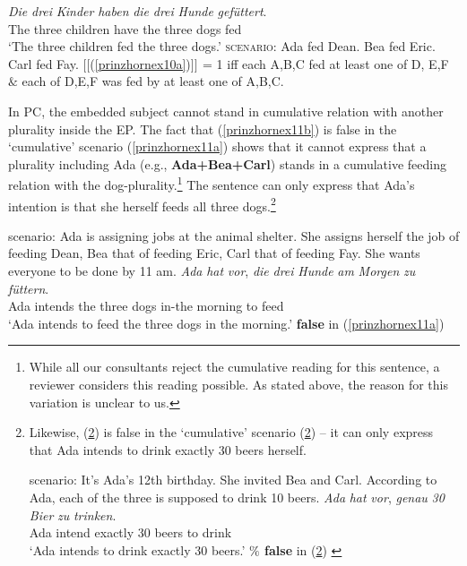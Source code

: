 \documentclass[output=paper,colorlinks,citecolor=brown,
]{langscibook}
\newcommand{\sem}[2]{\mbox{$[\![${#2}$]\!]^{#1}$}} %
\begin{document}
\ea \label{prinzhornmyex}
\ea \gll \textit{Die} \textit{drei}  \textit{Kinder} \textit{haben} \textit{die} \textit{drei} \textit{Hunde} \textit{gef\"{u}ttert}.\\
    The three children have the three dogs fed \\
\glt `The three children fed the three dogs.' \label{prinzhornex10a}
\ex   \textsc{scenario}: Ada fed Dean. Bea fed Eric. Carl fed Fay.  \label{prinzhornex10b}
\ex \sem{}{(\ref{prinzhornex10a})} = 1 iff each A,B,C fed at least one of  D, E,F $\&$ each of D,E,F was fed by at least one of A,B,C.\label{prinzhornex10c}
\z \z

In PC, the embedded subject cannot stand in cumulative relation with another plurality inside the EP. The fact that (\ref{prinzhornex11b}) is false in the `cumulative' scenario (\ref{prinzhornex11a}) shows that it cannot express that a plurality including Ada (e.g., \textbf{Ada+Bea+Carl}) stands in a cumulative feeding relation with the dog-plurality.\footnote{While all our consultants reject the cumulative reading for this sentence, a reviewer considers this reading possible. As stated above, the reason for this variation is unclear to us.} The sentence can only express that Ada's intention is that she herself feeds all three dogs.\footnote{Likewise, (\ref{prinzhornex12b}) is false in the `cumulative' scenario (\ref{prinzhornex12a}) -- it can only express that Ada intends to drink exactly 30 beers herself. 

\ea 
\ea \label{prinzhornex12a} {\sc scenario: } It's Ada's 12th birthday. She invited Bea and Carl. According to Ada, each of the three is supposed to drink 10 beers.
\ex \gll \textit{Ada} \textit{hat} \textit{vor}, \textit{genau} \textit{30} \textit{Bier} \textit{zu} \textit{trinken}.\\
   Ada intend {} exactly 30 beers to drink \\
   \glt `Ada intends to drink exactly 30 beers.' \hfill \textbf{$\%$ false} in (\ref{prinzhornex12a})  \label{prinzhornex12b}
\z \z

}

\ea \label{prinzhornex11}
\ea \label{prinzhornex11a} {\sc scenario: } Ada is assigning jobs at the animal shelter. She assigns herself the job of feeding Dean,  Bea that of feeding  Eric,  Carl that of feeding  Fay. She wants everyone to be done by 11 am. 
\ex \gll \textit{Ada} \textit{hat} \textit{vor}, \textit{die} \textit{drei} \textit{Hunde} \textit{am} \textit{Morgen} \textit{zu} \textit{f\"{u}ttern}.\\
   Ada intends {} the three dogs in-the morning to feed \\
   \glt `Ada intends to feed the three dogs in the morning.' \hfill \textbf{false} in (\ref{prinzhornex11a}) \label{prinzhornex11b}
\z \z
\end{document}

